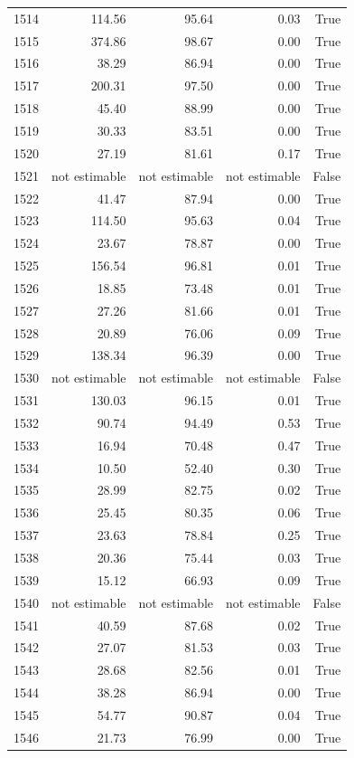 \begin{longtable}{rrrrr}
1514 & 114.56 & 95.64 & 0.03 & True \\
1515 & 374.86 & 98.67 & 0.00 & True \\
1516 & 38.29 & 86.94 & 0.00 & True \\
1517 & 200.31 & 97.50 & 0.00 & True \\
1518 & 45.40 & 88.99 & 0.00 & True \\
1519 & 30.33 & 83.51 & 0.00 & True \\
1520 & 27.19 & 81.61 & 0.17 & True \\
1521 & not estimable & not estimable & not estimable & False \\
1522 & 41.47 & 87.94 & 0.00 & True \\
1523 & 114.50 & 95.63 & 0.04 & True \\
1524 & 23.67 & 78.87 & 0.00 & True \\
1525 & 156.54 & 96.81 & 0.01 & True \\
1526 & 18.85 & 73.48 & 0.01 & True \\
1527 & 27.26 & 81.66 & 0.01 & True \\
1528 & 20.89 & 76.06 & 0.09 & True \\
1529 & 138.34 & 96.39 & 0.00 & True \\
1530 & not estimable & not estimable & not estimable & False \\
1531 & 130.03 & 96.15 & 0.01 & True \\
1532 & 90.74 & 94.49 & 0.53 & True \\
1533 & 16.94 & 70.48 & 0.47 & True \\
1534 & 10.50 & 52.40 & 0.30 & True \\
1535 & 28.99 & 82.75 & 0.02 & True \\
1536 & 25.45 & 80.35 & 0.06 & True \\
1537 & 23.63 & 78.84 & 0.25 & True \\
1538 & 20.36 & 75.44 & 0.03 & True \\
1539 & 15.12 & 66.93 & 0.09 & True \\
1540 & not estimable & not estimable & not estimable & False \\
1541 & 40.59 & 87.68 & 0.02 & True \\
1542 & 27.07 & 81.53 & 0.03 & True \\
1543 & 28.68 & 82.56 & 0.01 & True \\
1544 & 38.28 & 86.94 & 0.00 & True \\
1545 & 54.77 & 90.87 & 0.04 & True \\
1546 & 21.73 & 76.99 & 0.00 & True \\

\end{longtable}
